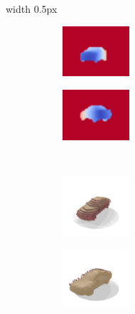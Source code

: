 \begin{figure}
\begin{subfigure}[t]{0.31\textwidth}
\begin{subfigure}[t]{0.475\textwidth}
        \end{subfigure}
    \end{subfigure}
    {\color{black!25}\vrule width 0.5px}
    \begin{subfigure}[t]{0.31\textwidth}
        \vspace{0px}
        \centering
        \begin{subfigure}[t]{0.475\textwidth}
            \vspace{0px}
            \centering
            \includegraphics[width=2.5cm]{gfx/appendix_experiments_shapenet/depths/18}
        \end{subfigure}
        \begin{subfigure}[t]{0.475\textwidth}
            \vspace{0px}
            \centering
            \includegraphics[width=2.5cm]{gfx/appendix_experiments_shapenet/depths/54}
        \end{subfigure}\\[0.15cm]
        \begin{subfigure}[t]{0.475\textwidth}
            \vspace{0px}
            \centering
            \includegraphics[width=2.5cm,trim={0.25cm 0.5cm 1.5cm 1.5cm},clip]{gfx/experiments_data/clean*/simplified/00001}
        \end{subfigure}
        \begin{subfigure}[t]{0.475\textwidth}
            \vspace{0px}
            \centering
            \includegraphics[width=2.5cm,trim={0.25cm 0.5cm 1.5cm 1.5cm},clip]{gfx/experiments_data/clean*/simplified/00009}

\end{subfigure}
\end{subfigure}
\end{figure}
